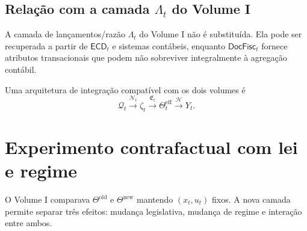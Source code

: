 \documentclass[11pt,a4paper]{article}
\newcommand{\cH}{\mathcal{H}}
\newcommand{\cQ}{\mathcal{Q}}
\newcommand{\cN}{\mathcal{N}}
\begin{document}
\subsection{Relação com a camada $\Lambda_t$ do Volume I}

A camada de lançamentos/razão $\Lambda_t$ do Volume I não é substituída. Ela pode ser recuperada a partir de $\mathsf{ECD}_t$ e sistemas contábeis, enquanto $\mathsf{DocFisc}_t$ fornece atributos transacionais que podem não sobreviver integralmente à agregação contábil.

\begin{formalizacao}
Uma arquitetura de integração compatível com os dois volumes é
\[
\cQ_t
\xrightarrow{\cN_t}
\zeta_t
\xrightarrow{\mathfrak E_t}
\Theta_t^{\mathrm{eff}}
\xrightarrow{\cH}
Y_t.
\]
\end{formalizacao}

\begin{center}
\end{center}

\section{Experimento contrafactual com lei e regime}

O Volume I comparava $\Theta^{\mathrm{old}}$ e $\Theta^{\mathrm{new}}$ mantendo $(x_t,u_t)$ fixos. A nova camada permite separar três efeitos: mudança legislativa, mudança de regime e interação entre ambos.
\end{document}
